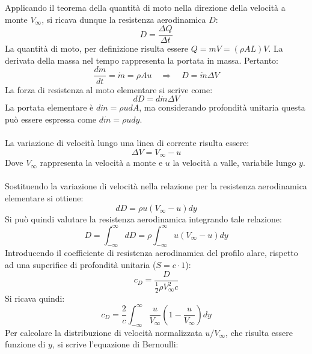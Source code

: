 \noindent Applicando il teorema della quantità di moto nella direzione della velocità a monte $V_\infty$, si ricava dunque la resistenza aerodinamica $D$:
\begin{equation*}
    D = \frac{\Delta Q}{\Delta t}
\end{equation*}
La quantità di moto, per definizione risulta essere $Q=mV=(\rho AL )V$. La derivata della massa nel tempo rappresenta la portata in massa. Pertanto:
\begin{equation*}
    \frac{dm}{dt} = \dot m = \rho A u \quad \Rightarrow \quad D= \dot m \Delta V
\end{equation*}
La forza di resistenza al moto elementare si scrive come:
\begin{equation*}
    dD = d\dot m \Delta V
\end{equation*}
La portata elementare è $d\dot m = \rho u dA$, ma considerando profondità unitaria questa può essere espressa come $d\dot m = \rho u dy$.\\\\
La variazione di velocità lungo una linea di corrente risulta essere:
\begin{equation*}
    \Delta V = V_\infty - u
\end{equation*}
Dove $V_\infty$ rappresenta la velocità a monte e $u$ la velocità a valle, variabile lungo $y$.\\\\
Sostituendo la variazione di velocità nella relazione per la resistenza aerodinamica elementare si ottiene:
\begin{equation*}
    dD = \rho u (V_\infty -u ) dy
\end{equation*}
Si può quindi valutare la resistenza aerodinamica integrando tale relazione:
\begin{equation*}
    D = \int_{-\infty}^\infty dD = \rho \int_{-\infty}^\infty u (V_\infty - u) dy
\end{equation*}
Introducendo il coefficiente di resistenza aerodinamica del profilo alare, rispetto ad una superifice di profondità unitaria ($S = c\cdot1$):
\begin{equation*}
    c_D = \frac{D}{\frac12 \rho V_\infty^2 c}
\end{equation*}
Si ricava quindi:
\begin{equation*}
    c_D = \frac 2c \int_{-\infty}^\infty \frac {u}{V_\infty} \left( 1-\frac{u}{V_\infty}\right) dy
\end{equation*}
Per calcolare la distribuzione di velocità normalizzata $u/V_\infty$, che risulta essere funzione di $y$, si scrive l'equazione di Bernoulli:
